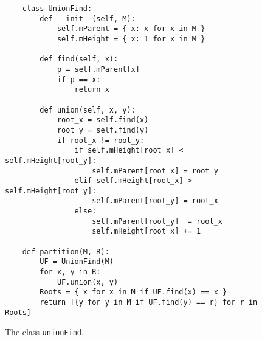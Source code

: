 \begin{figure}[!ht]
\centering
\begin{verbatim}
    class UnionFind:
        def __init__(self, M):
            self.mParent = { x: x for x in M }
            self.mHeight = { x: 1 for x in M }
            
        def find(self, x):
            p = self.mParent[x]
            if p == x:
                return x

        def union(self, x, y):
            root_x = self.find(x)
            root_y = self.find(y)
            if root_x != root_y:
                if self.mHeight[root_x] < self.mHeight[root_y]:
                    self.mParent[root_x] = root_y
                elif self.mHeight[root_x] > self.mHeight[root_y]:
                    self.mParent[root_y] = root_x
                else:
                    self.mParent[root_y]  = root_x
                    self.mHeight[root_x] += 1
                    
    def partition(M, R):
        UF = UnionFind(M)
        for x, y in R:
            UF.union(x, y)
        Roots = { x for x in M if UF.find(x) == x }
        return [{y for y in M if UF.find(y) == r} for r in Roots]
\end{verbatim}
\vspace*{-0.3cm}
\caption{The class \texttt{unionFind}.}
\label{fig:Union-Find-OO.ipynb}
\end{figure}

